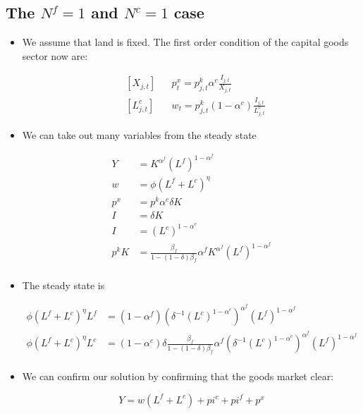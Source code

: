 \documentclass[11pt]{article}
\numberwithin{equation}{section}
\begin{document}
\subsection{The $N^f=1$ and $N^c=1$ case}



\begin{itemize}
	
	
	
	\item We assume that land is fixed. The first order condition of the capital goods sector now are:

	\begin{align}
	& \left[X_{j,t}\right]
	&&
	p^x_{t} = p^k_{j,t} \alpha^c \frac{I_{j,t}}{X_{j,t}}
	\\
	& \left[L^c_{j,t}\right]
	&&
	w_t = p^k_{j,t} (1-\alpha^c) \frac{I_{j,t}}{L^c_{j,t}}
	\end{align}
	
	
	\item We can take out many variables from the steady state 
	
		\begin{align*}
		Y & =  	K^{\alpha^f} \left(L^f\right)^{1-\alpha^f} \\
		w  & = \phi \left(L^f+L^c\right)^{\eta}\\
		p^x & = p^k  \alpha^c \delta K  \\
		I & = \delta K\\
		I & = \left(L^c\right)^{1-\alpha^c}\\
	p^k K & =\frac{\beta_f}{1-(1-\delta)\beta_f}  \alpha^f K^{\alpha^f} \left(L^f\right)^{1-\alpha^f}  \\ 
	\end{align*}
	
	\item The steady state is
	
		
	\begin{align*}
	\phi \left(L^f+L^c\right)^{\eta} L^f  & =  (1-\alpha^f) \left(\delta^{-1}\left(L^c\right)^{1-\alpha^c}\right)^{\alpha^f} \left(L^f\right)^{1-\alpha^f}  \\
	\phi \left(L^f+L^c\right)^{\eta} L^c  & =  (1-\alpha^c)\delta \frac{\beta_f}{1-(1-\delta)\beta_f}  \alpha^f  \left(\delta^{-1}\left(L^c\right)^{1-\alpha^c}\right)^{\alpha^f} \left(L^f\right)^{1-\alpha^f} \\
	\end{align*}
	
	\item We can confirm our solution by confirming that the goods market clear:
	
	  $$Y  =  w \left(L^f+L^c\right) + pi^c + pi^f +p^x $$
\end{itemize}
\end{document}

